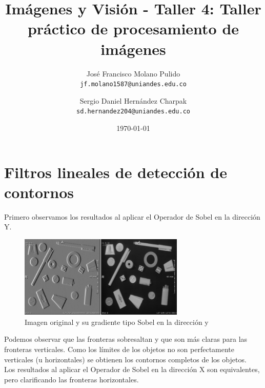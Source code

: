 \documentclass{article}
\title{Imágenes y Visión - Taller 4: Taller práctico de procesamiento de imágenes} %
\author{
  José Francisco Molano Pulido\\
  \texttt{jf.molano1587@uniandes.edu.co}
  \and
  Sergio Daniel Hernández Charpak\\
  \texttt{sd.hernandez204@uniandes.edu.co}
}
\date{\today} %
\begin{document}
\maketitle %

\tableofcontents

\newpage

\section{Filtros lineales de detección de contornos}

Primero observamos los resultados al aplicar el Operador de Sobel en la dirección Y.

\begin{figure}[ht]
\begin{center}
\includegraphics[width=0.7\textwidth]{1Filtros/1_sobel_y_orig.png} %
\caption{Imagen original y su gradiente tipo Sobel en la dirección y}
\label{fg:sobel_y}
\end{center}
\end{figure}
\FloatBarrier

Podemos observar que las fronteras sobresaltan y que son más claras para las fronteras verticales. Como los límites de los objetos no son perfectamente verticales (u horizontales) se obtienen los contornos completos de los objetos.\\
Los resultados al aplicar el Operador de Sobel en la dirección X son equivalentes, pero clarificando las fronteras horizontales.
\end{document}
